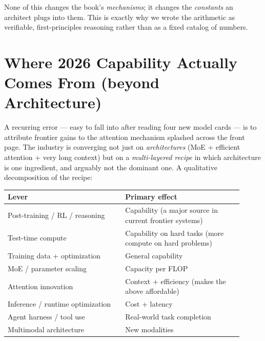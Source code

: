 None of this changes the book's \emph{mechanisms}; it changes the
\emph{constants} an architect plugs into them. This is exactly why we
wrote the arithmetic as verifiable, first-principles reasoning rather
than as a fixed catalog of numbers.

\section{Where 2026 Capability Actually Comes From (beyond
Architecture)}\label{where-2026-capability-actually-comes-from-beyond-architecture}

A recurring error --- easy to fall into after reading four new model
cards --- is to attribute frontier gains to the attention mechanism
splashed across the front page. The industry is converging not just on
\emph{architectures} (MoE + efficient attention + very long context) but
on a \emph{multi-layered recipe} in which architecture is one
ingredient, and arguably not the dominant one. A qualitative
decomposition of the recipe:

\nopagebreak[4]
\begin{longtable}[]{@{}
  >{\raggedright\arraybackslash}p{0.4527\linewidth}
  >{\raggedright\arraybackslash}p{0.4527\linewidth}@{}}
\toprule\noalign{}
\begin{minipage}[b]{\linewidth}\raggedright
Lever
\end{minipage} & \begin{minipage}[b]{\linewidth}\raggedright
Primary effect
\end{minipage} \\
\midrule\noalign{}
\endhead
\bottomrule\noalign{}
\endlastfoot
Post-training / RL / reasoning & Capability (a major source in current
frontier systems) \\
\noalign{\label{tab:27.2}}
Test-time compute & Capability on hard tasks (more compute on hard
problems) \\
Training data + optimization & General capability \\
MoE / parameter scaling & Capacity per FLOP \\
Attention innovation & Context + efficiency (makes the above
affordable) \\
Inference / runtime optimization & Cost + latency \\
Agent harness / tool use & Real-world task completion \\
Multimodal architecture & New modalities \\
\end{longtable}

